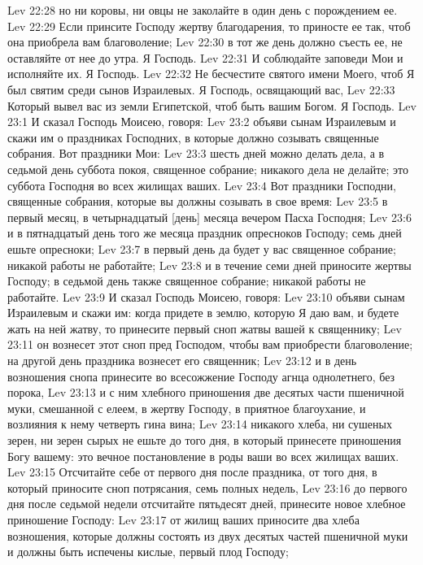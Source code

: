 \vs Lev 22:28 но ни коровы, ни овцы не заколайте в один день с порождением ее.
\vs Lev 22:29 Если принсите Господу жертву благодарения, то приносте ее так, чтоб она приобрела вам благоволение;
\vs Lev 22:30 в тот же день должно съесть ее, не оставляйте от нее до утра. Я Господь.
\rsbpar\vs Lev 22:31 И соблюдайте заповеди Мои и исполняйте их. Я Господь.
\vs Lev 22:32 Не бесчестите святого имени Моего, чтоб Я был святим среди сынов Израилевых. Я Господь, освящающий вас,
\vs Lev 22:33 Который вывел вас из земли Египетской, чтоб быть вашим Богом. Я Господь.
\vs Lev 23:1 И сказал Господь Моисею, говоря:
\vs Lev 23:2 объяви сынам Израилевым и скажи им о праздниках Господних, в которые должно созывать священные собрания. Вот праздники Мои:
\vs Lev 23:3 шесть дней можно делать дела, а в седьмой день суббота покоя, священное собрание; никакого дела не делайте; это суббота Господня во всех жилищах ваших.
\rsbpar\vs Lev 23:4 Вот праздники Господни, священные собрания, которые вы должны созывать в свое время:
\vs Lev 23:5 в первый месяц, в четырнадцатый [день] месяца вечером Пасха Господня;
\vs Lev 23:6 и в пятнадцатый день того же месяца праздник опресноков Господу; семь дней ешьте опресноки;
\vs Lev 23:7 в первый день да будет у вас священное собрание; никакой работы не работайте;
\vs Lev 23:8 и в течение семи дней приносите жертвы Господу; в седьмой день также священное собрание; никакой работы не работайте.
\rsbpar\vs Lev 23:9 И сказал Господь Моисею, говоря:
\vs Lev 23:10 объяви сынам Израилевым и скажи им: когда придете в землю, которую Я даю вам, и будете жать на ней жатву, то принесите первый сноп жатвы вашей к священнику;
\vs Lev 23:11 он вознесет этот сноп пред Господом, чтобы вам приобрести благоволение; на другой день праздника вознесет его священник;
\vs Lev 23:12 и в день возношения снопа принесите во всесожжение Господу агнца однолетнего, без порока,
\vs Lev 23:13 и с ним хлебного приношения две десятых части  пшеничной муки, смешанной с елеем, в жертву Господу, в приятное благоухание, и возлияния к нему четверть гина вина;
\vs Lev 23:14 никакого  хлеба, ни сушеных зерен, ни зерен сырых не ешьте до того дня, в который принесете приношения Богу вашему: это вечное постановление в роды ваши во всех жилищах ваших.
\vs Lev 23:15 Отсчитайте себе от первого дня после праздника, от того дня, в который приносите сноп потрясания, семь полных недель,
\vs Lev 23:16 до первого дня после седьмой недели отсчитайте пятьдесят дней,  принесите новое хлебное приношение Господу:
\vs Lev 23:17 от жилищ ваших приносите два хлеба возношения, которые должны состоять из двух десятых частей  пшеничной муки и должны быть испечены кислые,  первый плод Господу;
